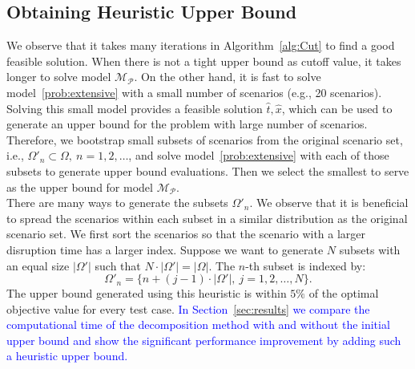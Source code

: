 \documentclass[11pt]{article}
\newcommand{\tcb}{\textcolor{blue}}
\begin{document}
	\subsection{Obtaining Heuristic Upper Bound} \label{subsec:HUB}
	We observe that it takes many iterations in Algorithm~\ref{alg:Cut} to find a good feasible solution. When there is not a tight upper bound as cutoff value, it takes longer to solve model \(\mathcal{M}_{\mathcal{P}}\). On the other hand, it is fast to solve model~\eqref{prob:extensive} with a small number of scenarios (e.g., 20 scenarios). Solving this small model provides a feasible solution \(\hat{t},\hat{x}\), which can be used to generate an upper bound for the problem with large number of scenarios. Therefore, we bootstrap small subsets of scenarios from the original scenario set, i.e., \(\Omega'_n \subset \Omega,\ n = 1,2,\dots\), and solve model~\eqref{prob:extensive} with each of those subsets to generate upper bound evaluations. Then we select the smallest to serve as the upper bound for model \(\mathcal{M}_{\mathcal{P}}\). \\
	\newline
	There are many ways to generate the subsets \(\Omega'_n\). We observe that it is beneficial to spread the scenarios within each subset in a similar distribution as the original scenario set. We first sort the scenarios so that the scenario with a larger disruption time has a larger index. Suppose we want to generate \(N\) subsets with an equal size \(|\Omega'|\) such that \(N \cdot |\Omega'| = |\Omega|\). The \(n\)-th subset is indexed by:
	\[\Omega'_n = \{n + (j - 1) \cdot |\Omega'|,\ j = 1,2,\dots, N\}.\]
	The upper bound generated using this heuristic is within \(5\%\) of the optimal objective value for every test case. \tcb{In Section~\ref{sec:results} we compare the computational time of the decomposition method with and without the initial upper bound and show the significant performance improvement by adding such a heuristic upper bound.}
	
\end{document}
